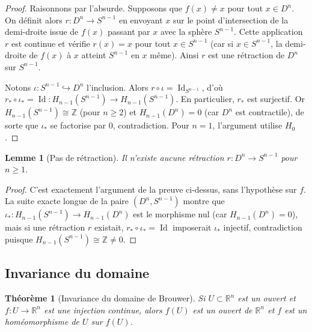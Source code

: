 \documentclass[12pt,a4paper,openany]{book}
\theoremstyle{definition}
\theoremstyle{plain}
\newtheorem{theoreme}[definition]{Théorème}
\newtheorem{lemme}[definition]{Lemme}
\theoremstyle{remark}
\newcommand{\Z}{\mathbb{Z}}
\newcommand{\R}{\mathbb{R}}
\DeclareMathOperator{\Id}{Id}
\begin{document}
\begin{proof}
Raisonnons par l'absurde. Supposons que $f(x) \neq x$ pour tout $x \in D^n$.
On définit alors $r \colon D^n \to S^{n-1}$ en envoyant $x$ sur le point d'intersection de
la demi-droite issue de $f(x)$ passant par $x$ avec la sphère $S^{n-1}$.
Cette application $r$ est continue et vérifie $r(x) = x$ pour tout $x \in S^{n-1}$
(car si $x \in S^{n-1}$, la demi-droite de $f(x)$ à $x$ atteint $S^{n-1}$ en $x$ même).
Ainsi $r$ est une rétraction de $D^n$ sur $S^{n-1}$.

Notons $\iota \colon S^{n-1} \hookrightarrow D^n$ l'inclusion. Alors $r \circ \iota = \Id_{S^{n-1}}$,
d'où $r_* \circ \iota_* = \Id \colon H_{n-1}(S^{n-1}) \to H_{n-1}(S^{n-1})$.
En particulier, $r_*$ est surjectif. Or $H_{n-1}(S^{n-1}) \cong \Z$ (pour $n \geq 2$) et
$H_{n-1}(D^n) = 0$ (car $D^n$ est contractile), de sorte que $\iota_*$ se factorise par $0$,
contradiction. Pour $n=1$, l'argument utilise $H_0$.
\end{proof}

\begin{lemme}[Pas de rétraction]\label{lem:pas-retraction}
Il n'existe aucune rétraction $r \colon D^n \to S^{n-1}$ pour $n \geq 1$.
\end{lemme}

\begin{proof}
C'est exactement l'argument de la preuve ci-dessus, sans l'hypothèse sur $f$.
La suite exacte longue de la paire $(D^n, S^{n-1})$ montre que
$\iota_* \colon H_{n-1}(S^{n-1}) \to H_{n-1}(D^n)$ est le morphisme nul (car
$H_{n-1}(D^n) = 0$), mais si une rétraction $r$ existait, $r_* \circ \iota_* = \Id$
imposerait $\iota_*$ injectif, contradiction puisque $H_{n-1}(S^{n-1}) \cong \Z \neq 0$.
\end{proof}

\subsection{Invariance du domaine}\label{subsec:invariance-domaine}

\begin{theoreme}[Invariance du domaine de Brouwer]\label{thm:invariance-domaine}
Si $U \subset \R^n$ est un ouvert et $f \colon U \to \R^n$ est une injection continue, alors
$f(U)$ est un ouvert de $\R^n$ et $f$ est un homéomorphisme de $U$ sur $f(U)$.
\end{theoreme}
\end{document}

